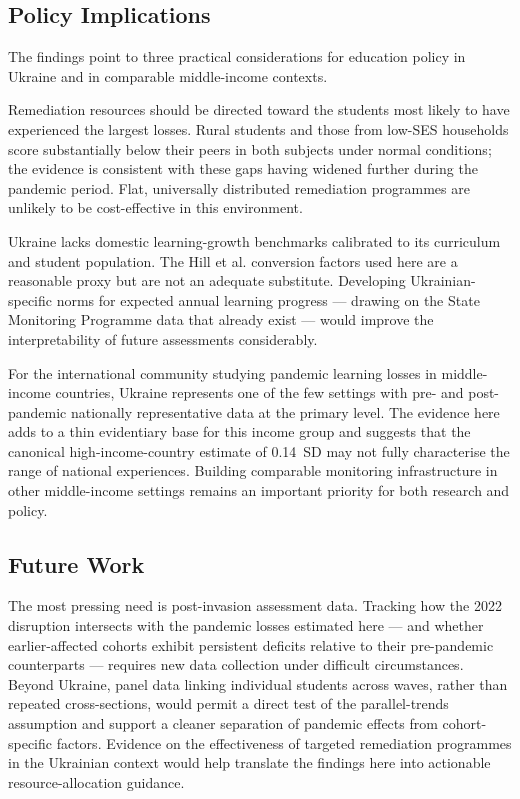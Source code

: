 \subsection*{Policy Implications}

The findings point to three practical considerations for education policy
in Ukraine and in comparable middle-income contexts.

Remediation resources should be directed toward the students most likely
to have experienced the largest losses. Rural students and those from
low-SES households score substantially below their peers in both
subjects under normal conditions; the evidence is consistent with these
gaps having widened further during the pandemic period. Flat,
universally distributed remediation programmes are unlikely to be
cost-effective in this environment.

Ukraine lacks domestic learning-growth benchmarks calibrated to its
curriculum and student population. The Hill et al. conversion factors
used here are a reasonable proxy but are not an adequate substitute.
Developing Ukrainian-specific norms for expected annual learning
progress --- drawing on the State Monitoring Programme data that already
exist --- would improve the interpretability of future assessments
considerably.

For the international community studying pandemic learning losses in
middle-income countries, Ukraine represents one of the few settings
with pre- and post-pandemic nationally representative data at the
primary level. The evidence here adds to a thin evidentiary base for
this income group and suggests that the canonical high-income-country
estimate of 0.14~SD may not fully characterise the range of national
experiences. Building comparable monitoring infrastructure in other
middle-income settings remains an important priority for both research
and policy.

\subsection*{Future Work}

The most pressing need is post-invasion assessment data. Tracking how
the 2022 disruption intersects with the pandemic losses estimated here ---
and whether earlier-affected cohorts exhibit persistent deficits relative
to their pre-pandemic counterparts --- requires new data collection under
difficult circumstances. Beyond Ukraine, panel data linking individual
students across waves, rather than repeated cross-sections, would permit
a direct test of the parallel-trends assumption and support a cleaner
separation of pandemic effects from cohort-specific factors. Evidence
on the effectiveness of targeted remediation programmes in the Ukrainian
context would help translate the findings here into actionable
resource-allocation guidance.
